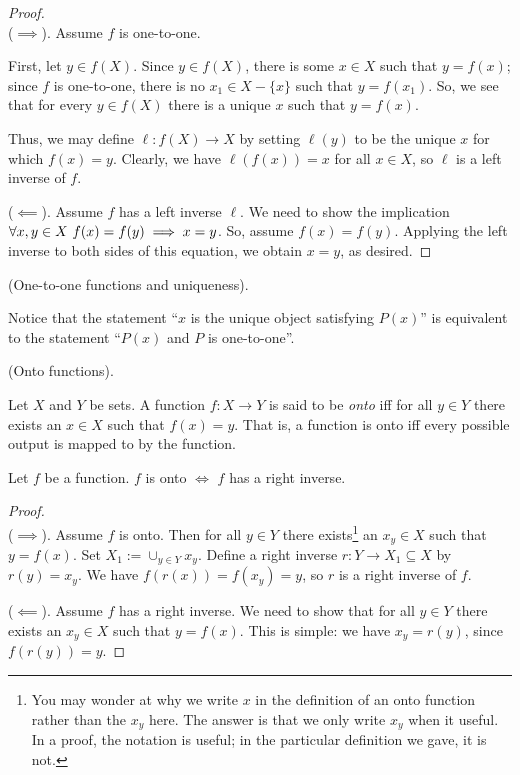 \begin{proof}
    \mbox{} \\

    ($\implies$). Assume $f$ is one-to-one.
    
    First, let $y \in f(X)$. Since $y \in f(X)$, there is some $x \in X$ such that $y = f(x)$; since $f$ is one-to-one, there is no $x_1 \in X - \{x\}$ such that $y = f(x_1)$. So, we see that for every $y \in f(X)$ there is a unique $x$ such that $y = f(x)$.
    
    Thus, we may define $\ell:f(X) \rightarrow X$ by setting $\ell(y)$ to be the unique $x$ for which $f(x) = y$. Clearly, we have $\ell(f(x)) = x$ for all $x \in X$, so $\ell$ is a left inverse of $f$.

    ($\impliedby$). Assume $f$ has a left inverse $\ell$. We need to show the implication $\forall x, y \in X \text{ } f(x) = f(y) \implies x = y$. So, assume $f(x) = f(y)$. Applying the left inverse to both sides of this equation, we obtain $x = y$, as desired. 
\end{proof}

\begin{remark}
    (One-to-one functions and uniqueness).

    Notice that the statement ``$x$ is the unique object satisfying $P(x)$'' is equivalent to the statement ``$P(x)$ and $P$ is one-to-one''.
\end{remark}

\begin{defn}
    (Onto functions).

    Let $X$ and $Y$ be sets. A function $f:X \rightarrow Y$ is said to be \textit{onto} iff for all $y \in Y$ there exists an $x \in X$ such that $f(x) = y$. That is, a function is onto iff every possible output is mapped to by the function. 
\end{defn}

\begin{theorem}
    Let $f$ be a function. $f$ is onto $\iff$ $f$ has a right inverse.
\end{theorem}

\begin{proof}
    \mbox{} \\

    ($\implies$). Assume $f$ is onto. Then for all $y \in Y$ there exists\footnote{You may wonder at why we write $x$ in the definition of an onto function rather than the $x_y$ here. The answer is that we only write $x_y$ when it useful. In a proof, the notation is useful; in the particular definition we gave, it is not.} an $x_y \in X$ such that $y = f(x)$. Set $X_1 := \cup_{y \in Y} x_y$. Define a right inverse $r:Y \rightarrow X_1 \subseteq X$ by $r(y) = x_y$. We have $f(r(x)) = f(x_y) = y$, so $r$ is a right inverse of $f$.

    ($\impliedby$). Assume $f$ has a right inverse. We need to show that for all $y \in Y$ there exists an $x_y \in X$ such that $y = f(x)$. This is simple: we have $x_y = r(y)$, since $f(r(y)) = y$.
\end{proof}

